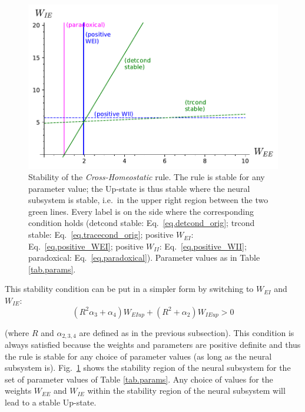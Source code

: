 \documentclass[twocolumn]{article}
\newcommand{\EE}{\mathit{EE}}
\newcommand{\EI}{\mathit{EI}}
\newcommand{\IE}{\mathit{IE}}
\newcommand{\II}{\mathit{II}}
\newcommand{\up}{\mathit{up}}
\begin{document}
\begin{figure}[ht]
\centering
\includegraphics[width=\linewidth]{CH_stability}
\caption{Stability of the {\em Cross-Homeostatic} rule. The rule is stable for any parameter value; the Up-state is thus stable where the neural subsystem is stable, i.e.\ in the upper right region between the two green lines. Every label is on the side where the corresponding condition  holds (detcond stable: Eq.\ \ref{eq.detcond_orig}; trcond stable: Eq.\ \ref{eq.tracecond_orig}; positive $W_{\EI}$: Eq.\ \ref{eq.positive_WEI}; positive $W_{\II}$: Eq.\ \ref{eq.positive_WII}; paradoxical: Eq.\ \ref{eq.paradoxical}). Parameter values as in Table \ref{tab.params}.}
\label{fig.CH_stability}
\end{figure}




This stability condition can be put in a simpler form by switching to $W_{\EI}$ and $W_{\IE}$:
\begin{equation}
(R^2 \alpha_3 + \alpha_4) W_{\EI\up} + (R^2 + \alpha_2) W_{\IE\up} > 0
\label{eq.CH_stable_cond_v2}
\end{equation}

\noindent (where $R$ and $\alpha_{2,3,4}$ are defined as in the previous subsection). This condition is always satisfied because the weights and parameters are positive definite and thus the rule is stable for any choice of parameter values (as long as the neural subsystem is). Fig.\ \ref{fig.CH_stability} shows the stability region of the neural subsystem for the set of parameter values of Table \ref{tab.params}. Any choice of values for the weights $W_{\EE}$ and $W_{\IE}$ within the stability region of the neural subsystem will lead to a stable Up-state.
\end{document}
